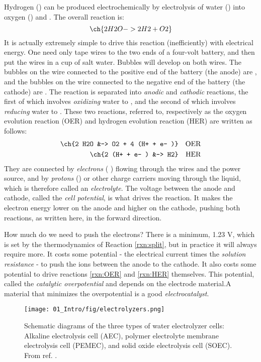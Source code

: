 \vspace{5mm}
Hydrogen () can be produced electrochemically by electrolysis of water () into oxygen () and . The overall reaction is:
\begin{equation}
\ch{2 H2O -> 2 H2 + O2}\label{rxn:split}
\end{equation}
It is actually extremely simple to drive this reaction (inefficiently) with electrical energy. One need only tape wires to the two ends of a four-volt battery, and then put the wires in a cup of salt water. Bubbles will develop on both wires. The bubbles on the wire connected to the positive end of the battery (the anode) are , and the bubbles on the wire connected to the negative end of the battery (the cathode) are . The reaction is separated into \textit{anodic} and \textit{cathodic} reactions, the first of which involves \textit{oxidizing} water to , and the second of which involves \textit{reducing} water to . These two reactions, referred to, respectively as the oxygen evolution reaction (OER) and hydrogen evolution reaction (HER) are written as follows:
\begin{align}
\ch{2 H2O &-> O2 + 4 (H+ + e- )} &&\text{OER}\label{rxn:OER}\\
\ch{2 (H+ + e- ) &-> H2} &&\text{HER}\label{rxn:HER}
\end{align}
They are connected by \textit{electrons} ( ) flowing through the wires and the power source, and by \textit{protons} () or other charge carriers moving through the liquid, which is therefore called an \textit{electrolyte}. The voltage between the anode and cathode, called the \textit{cell potential}, is what drives the reaction. It makes the electron energy lower on the anode and higher on the cathode, pushing both reactions, as written here, in the forward direction. 

How much do we need to push the electrons? There is a minimum, 1.23 V, which is set by the thermodynamics of Reaction \ref{rxn:split}, but in practice it will always require more. It costs some potential - the electrical current times the \textit{solution resistance} - to push the ions between the anode to the cathode. It also costs some potential to drive reactions \ref{rxn:OER} and \ref{rxn:HER} themselves. This potential, called the \textit{catalytic overpotential} and depends on the electrode material.A material that minimizes the overpotential is a good \textit{electrocatalyst}.

\begin{figure}[h!]
	\centering
	\texttt{[image: 01\_Intro/fig/electrolyzers.png]}
	\caption{Schematic diagrams of the three types of water electrolyzer cells: Alkaline electrolysis cell (AEC), polymer electrolyte membrane electrolysis cell (PEMEC), and solid oxide electrolysis cell (SOEC). From ref. .}
	\label{fig:electrolyzers}
\end{figure}

